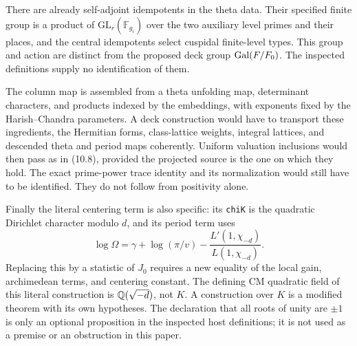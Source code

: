 There are already self-adjoint idempotents in the theta data.
Their specified finite group is a product of
$\mathrm{GL}_r(\mathbb F_{g_i})$ over the two auxiliary level
primes and their places, and the central idempotents select
cuspidal finite-level types. This group and action are distinct
from the proposed deck group $\operatorname{Gal}(F/F_0)$. The inspected
definitions supply no identification of them.

The column map is assembled from a theta unfolding map,
determinant characters, and products indexed by the embeddings,
with exponents fixed by the Harish--Chandra parameters. A deck
construction would have to transport these ingredients, the
Hermitian forms, class-lattice weights, integral lattices, and
descended theta and period maps coherently. Uniform valuation
inclusions would then pass as in (10.8), provided the projected
source is the one on which they hold. The exact prime-power
trace identity and its normalization would still have to be
identified. They do not follow from positivity alone.

Finally the literal centering term is also specific: its
\texttt{chiK} is the quadratic Dirichlet character modulo $d$,
and its period term uses
\[
 \log\Omega=\gamma+\log(\pi/v)
                     -\frac{L'(1,\chi_{-d})}{L(1,\chi_{-d})}.
                                                        \tag{11.5}
\]
Replacing this by a statistic of $J_0$ requires a new equality
of the local gain, archimedean terms, and centering constant.
The defining CM quadratic field of this literal construction
is $\mathbb Q(\sqrt{-d})$, not $K$. A construction over $K$ is a
modified theorem with its own hypotheses. The declaration that
all roots of unity are $\pm1$ is only an optional proposition in
the inspected host definitions; it is not used as a premise or
an obstruction in this paper.
